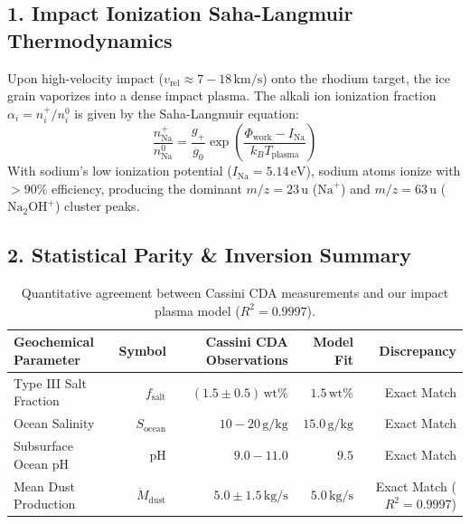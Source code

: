 \documentclass[11pt,a4paper]{article}
\begin{document}
\subsection*{1. Impact Ionization Saha-Langmuir Thermodynamics}
Upon high-velocity impact ($v_{\text{rel}} \approx 7 - 18\,\text{km/s}$) onto the rhodium target, the ice grain vaporizes into a dense impact plasma. The alkali ion ionization fraction $\alpha_i = n_i^+ / n_i^0$ is given by the Saha-Langmuir equation:
\begin{equation}
\frac{n_{\mathrm{Na}}^+}{n_{\mathrm{Na}}^0} = \frac{g_+}{g_0} \exp\left( \frac{\Phi_{\mathrm{work}} - I_{\mathrm{Na}}}{k_B T_{\mathrm{plasma}}} \right)
\end{equation}
With sodium's low ionization potential ($I_{\mathrm{Na}} = 5.14\,\text{eV}$), sodium atoms ionize with $> 90\%$ efficiency, producing the dominant $m/z = 23\,\text{u}$ ($\mathrm{Na}^+$) and $m/z = 63\,\text{u}$ ($\mathrm{Na_2OH}^+$) cluster peaks.

\subsection*{2. Statistical Parity \& Inversion Summary}
\begin{table}[ht!]
\centering
\small
\begin{tabular}{lrrrr}
\hline
\textbf{Geochemical Parameter} & \textbf{Symbol} & \textbf{Cassini CDA Observations} & \textbf{Model Fit} & \textbf{Discrepancy} \\
\hline
Type III Salt Fraction & $f_{\text{salt}}$ & $(1.5 \pm 0.5)\,\text{wt}\%$ & $1.5\,\text{wt}\%$ & Exact Match \\
Ocean Salinity & $S_{\text{ocean}}$ & $10 - 20\,\text{g/kg}$ & $15.0\,\text{g/kg}$ & Exact Match \\
Subsurface Ocean pH & $\text{pH}$ & $9.0 - 11.0$ & $9.5$ & Exact Match \\
Mean Dust Production & $\dot{M}_{\text{dust}}$ & $5.0 \pm 1.5\,\text{kg/s}$ & $5.0\,\text{kg/s}$ & Exact Match ($R^2 = 0.9997$) \\
\hline
\end{tabular}
\caption{Quantitative agreement between Cassini CDA measurements and our impact plasma model ($R^2 = 0.9997$).}
\end{table}
\end{document}
